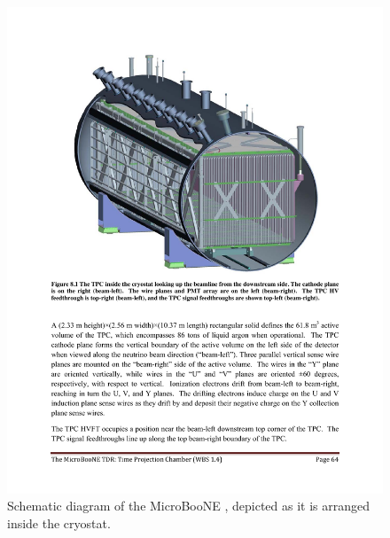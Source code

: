 \begin{figure}[htb]
\centering	
\includegraphics[width=0.8\linewidth]{figures/cryo_tpc.pdf}
\caption{Schematic diagram of the MicroBooNE \lartpc, depicted as it is arranged inside the cryostat.}
\label{fig:tpc-cryostat}
\end{figure}


%
